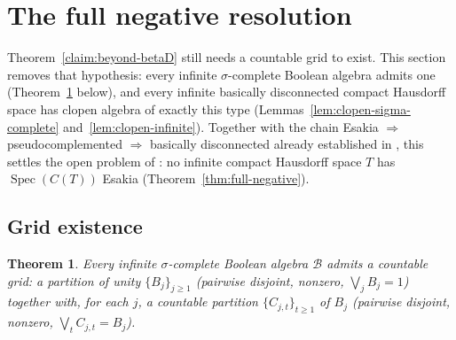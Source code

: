 \documentclass{amsart}
\newtheorem{theorem}{Theorem}
\theoremstyle{definition}
\theoremstyle{remark}
\newcommand{\Spec}[1]{\operatorname{Spec}\left(#1\right)}
\newcommand{\cont}[1]{C\left(#1\right)}
\begin{document}
\section{The full negative resolution}
\label{sec:full-negative}

Theorem~\ref{claim:beyond-betaD} still needs a countable grid to exist.
This section removes that hypothesis: every infinite $\sigma$-complete
Boolean algebra admits one (Theorem~\ref{thm:grid-existence} below), and
every infinite basically disconnected compact Hausdorff space has clopen
algebra of exactly this type (Lemmas~\ref{lem:clopen-sigma-complete}
and~\ref{lem:clopen-infinite}). Together with the chain Esakia
$\Rightarrow$ pseudocomplemented $\Rightarrow$ basically disconnected
already established in \cite[Thm.~5.6]{bezhanishvili-tressl-2026}, this
settles the open problem of \cite{bezhanishvili-tressl-2026}: no infinite
compact Hausdorff space $T$ has $\Spec{\cont{T}}$ Esakia
(Theorem~\ref{thm:full-negative}).

\subsection{Grid existence}

\begin{theorem}\label{thm:grid-existence}
Every infinite $\sigma$-complete Boolean algebra $\mathcal B$ admits a
countable grid: a partition of unity $\{B_j\}_{j\geq1}$ (pairwise
disjoint, nonzero, $\bigvee_jB_j=1$) together with, for each $j$, a
countable partition $\{C_{j,t}\}_{t\geq1}$ of $B_j$ (pairwise disjoint,
nonzero, $\bigvee_tC_{j,t}=B_j$).
\end{theorem}
\end{document}
